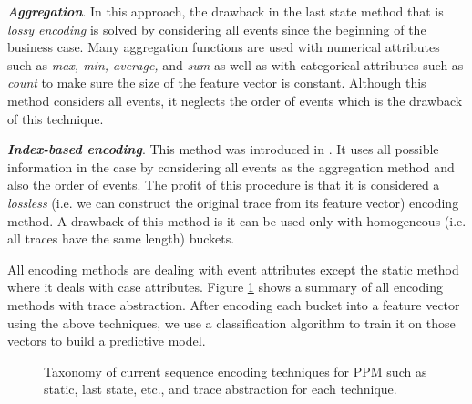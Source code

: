 \textbf{\textit{Aggregation}}. In this approach, the drawback in the last state method that is \textit{lossy encoding} is solved by considering all events since the beginning of the business case. Many aggregation functions are used with numerical attributes such as \textit{max, min, average,} and \textit{sum} as well as with categorical attributes such as \textit{count} \cite{de2016general} to make sure the size of the feature vector is constant. Although this method considers all events, it neglects the order of events which is the drawback of this technique.

\textbf{\textit{Index-based encoding}}. This method was introduced in \cite{van2012process}. It uses all possible information in the case by considering all events as the aggregation method and also the order of events. The profit of this procedure is that it is considered a \textit{lossless} (i.e. we can construct the original trace from its feature vector) encoding method.  A drawback of this method is it can be used only with homogeneous (i.e. all traces have the same length) buckets. 

All encoding methods are dealing with event attributes except the static method where it deals with case attributes. Figure \ref{fig:enc1} shows a summary of  all encoding methods with trace abstraction. After encoding each bucket into a feature vector using the above techniques, we use a classification algorithm to train it on those vectors to build a predictive model. 

\begin{figure}[htb]
	\begin{center}
		\caption[Encoding methods and trace abstraction]{Taxonomy of current sequence encoding techniques for PPM such as static, last state, etc., and trace abstraction for each technique.}
		\label{fig:enc1}
	\end{center}
\end{figure}

